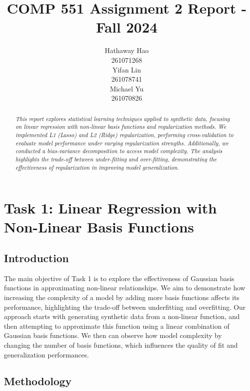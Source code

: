 \documentclass{article}
\title{COMP 551 Assignment 2 Report - Fall 2024}
\author{
 Hathaway Hao \\
  261071268\\
   \And
 Yifan Lin \\
  261078741\\
  \And
 Michael Yu \\
  261070826\\
}
\begin{document}
\maketitle
\begin{abstract}
\textit {This report explores statistical learning techniques applied to synthetic data, focusing on linear regression with non-linear basis functions and regularization methods. We implemented L1 (Lasso) and L2 (Ridge) regularization, performing cross-validation to evaluate model performance under varying regularization strengths. Additionally, we conducted a bias-variance decomposition to access model complexity. The analysis highlights the trade-off between under-fitting and over-fitting, demonstrating the effectiveness of regularization in improving model generalization.}
\end{abstract}

\section{Task 1: Linear Regression with Non-Linear Basis Functions}

\subsection{Introduction}
\noindent The main objective of Task 1 is to explore the effectiveness of Gaussian basis functions in approximating non-linear relationships. We aim to demonstrate how increasing the complexity of a model by adding more basis functions affects its performance, highlighting the trade-off between underfitting and overfitting. Our approach starts with generating synthetic data from a non-linear function, and then attempting to approximate this function using a linear combination of Gaussian basis functions. We then can observe how model complexity by changing the number of basis functions, which influences the quality of fit and generalization performances.


\subsection{Methodology}
\end{document}
